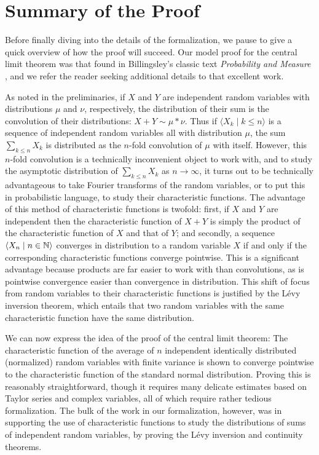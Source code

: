 \documentclass[leqno]{article}
\theoremstyle{definition}
\newcommand{\bldseq}[2]{\langle{#1}\mid{#2}\rangle}
\begin{document}
\section{Summary of the Proof} \label{sec:summary}

Before finally diving into the details of the formalization, we pause to give a quick overview of how the proof will succeed. Our model proof for the central limit theorem was that found in Billingsley's classic text {\em Probability and Measure} \cite{billingsley}, and we refer the reader seeking additional details to that excellent work.

As noted in the preliminaries, if $X$ and $Y$ are independent random variables with distributions $\mu$ and $\nu$, respectively, the distribution of their sum is the convolution of their distributions: $X + Y \sim \mu * \nu$. Thus if $\bldseq{X_k}{k \le n}$ is a sequence of independent random variables all with distribution $\mu$, the sum $\sum_{k \le n} X_k$ is distributed as the $n$-fold convolution of $\mu$ with itself. However, this $n$-fold convolution is a technically inconvenient object to work with, and to study the asymptotic distribution of $\sum_{k \le n} X_k$ as $n \rightarrow \infty$, it turns out to be technically advantageous to take Fourier transforms of the random variables, or to put this in probabilistic language, to study their characteristic functions. The advantage of this method of characteristic functions is twofold: first, if $X$ and $Y$ are independent then the characteristic function of $X + Y$ is simply the product of the characteristic function of $X$ and that of $Y$; and secondly, a sequence $\bldseq{X_n}{n \in \N}$ converges in distribution to a random variable $X$ if and only if the corresponding characteristic functions converge pointwise. This is a significant advantage because products are far easier to work with than convolutions, as is pointwise convergence easier than convergence in distribution. This shift of focus from random variables to their characteristic functions is justified by the L\'evy inversion theorem, which entails that two random variables with the same characteristic function have the same distribution.

We can now express the idea of the proof of the central limit theorem: The characteristic function of the average of $n$ independent identically distributed (normalized) random variables with finite variance is shown to converge pointwise to the characteristic function of the standard normal distribution. Proving this is reasonably straightforward, though it requires many delicate estimates based on Taylor series and complex variables, all of which require rather tedious formalization. The bulk of the work in our formalization, however, was in supporting the use of characteristic functions to study the distributions of sums of independent random variables, by proving the L\'evy inversion and continuity theorems.
\end{document}
